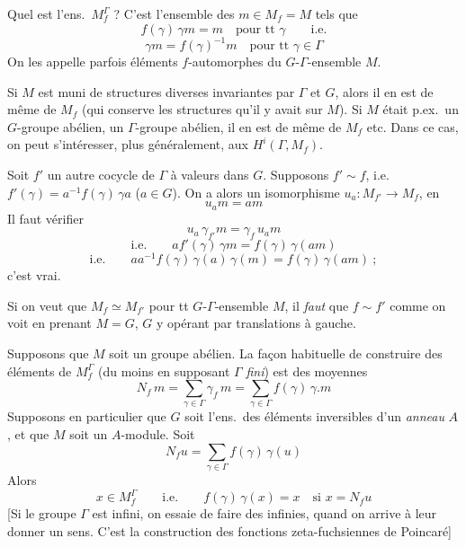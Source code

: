 \documentclass[11pt,a4paper]{article}
\begin{document}

Quel est l'ens.\ $M_f^{\Gamma}$ ? C'est l'ensemble des $m \in M_f = M$ tels
que
\[
  f(\gamma)\,\gamma m = m \quad \text{pour tt } \gamma \qquad \text{i.e.}
\]
\[
  \boxed{\gamma m = f(\gamma)^{-1} m \quad \text{pour tt } \gamma \in \Gamma}
\]
On les appelle parfois éléments $f$-automorphes du
$G$-$\Gamma$-ensemble $M$.

Si $M$ est muni  de structures diverses invariantes par $\Gamma$
et $G$, alors il en est de même de $M_f$ (qui conserve les structures qu'il y
avait sur $M$). Si $M$ était p.ex.\ un $G$-groupe abélien, \struck{\ill{}} un
$\Gamma$-groupe abélien, il en est de même de $M_f$ etc. Dans ce cas, on peut
s'intéresser, plus généralement, aux $H^i(\Gamma, M_f)$.

Soit $f'$ un autre cocycle \struck{\ill{}} de $\Gamma$ à valeurs dans $G$.
Supposons $f' \sim f$, i.e.\ $f'(\gamma) = a^{-1} f(\gamma)\,\gamma a$
($a \in G$). On a alors un isomorphisme $u_a : M_{f'} \to M_f$, en
 
\[
  u_a m = am
\]
Il faut vérifier
\[
  u_a\, \gamma_{f'} m = \gamma_f\, u_a m
\]
\[
  \text{i.e.} \qquad a f'(\gamma)\,\gamma m = f(\gamma)\,\gamma(am)
\]
\[
  \text{i.e.} \qquad a a^{-1} f(\gamma)\,\gamma(a)\,\gamma(m) =
  f(\gamma)\,\gamma(am) \ ;
\]
c'est vrai.

Si on veut que $M_{f} \simeq M_{f'}$ pour tt $G$-$\Gamma$-ensemble $M$, il
\emph{faut} que $f \sim f'$ comme on voit en prenant $M = G$, $G$ y opérant par
translations à gauche.


Supposons que $M$ soit un groupe abélien.
La façon habituelle de construire des éléments de $M_f^{\Gamma}$ (du moins en
supposant $\Gamma$ \emph{fini}) est   des moyennes
\[
  N_f\, m = \sum_{\gamma \in \Gamma} \gamma_f\, m
  = \sum_{\gamma \in \Gamma} f(\gamma)\,\gamma.m
\]
Supposons en particulier que $G$ soit l'ens.\ des éléments inversibles d'un
\emph{anneau} $A$, et que $M$ soit un $A$-module. Soit
 
\[
  N_f u = \sum_{\gamma \in \Gamma} f(\gamma)\,\gamma(u)
\]
Alors
\[
  x \in M_f^{\Gamma} \qquad \text{i.e.} \qquad f(\gamma)\,\gamma(x) = x
  \quad \text{si } x = N_f u
\]
[Si le groupe $\Gamma$ est infini, on essaie de
faire des  infinies, quand on arrive à leur donner un sens.
C'est la \struck{\ill{}} construction des fonctions zeta-fuchsiennes de
Poincaré]
\end{document}
